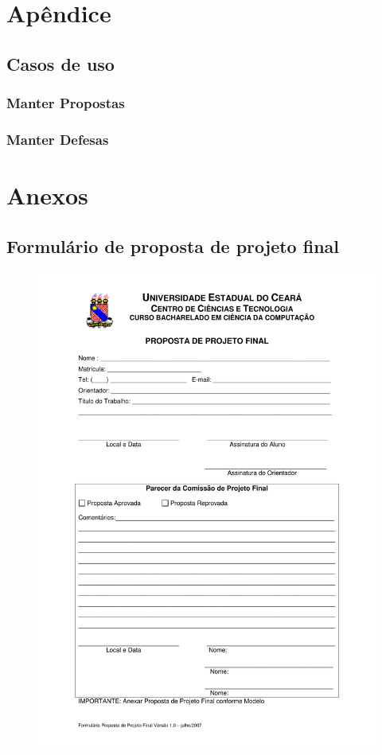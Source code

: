 \chapter{Apêndice}
\clearpage
\section{Casos de uso}
\subsection{Manter Propostas}


\clearpage
\subsection{Manter Defesas}



\chapter{Anexos}
\clearpage
\section{Formulário de proposta de projeto final}
\label{anx:proposta}
\begin{figure}[htbp]
\centering
\includegraphics[scale=0.6]{requisitos/Formulario_Proposta_Projeto_Final.pdf}
\end{figure}

